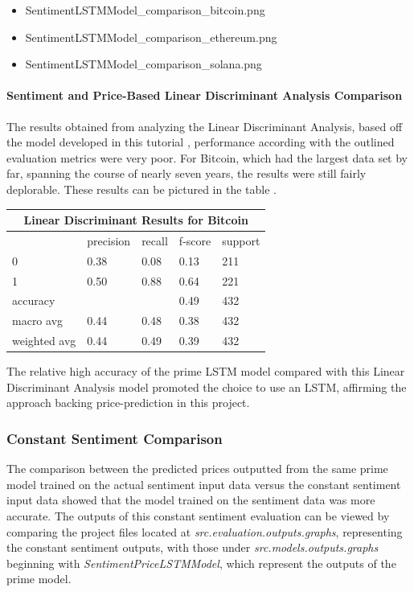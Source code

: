 \documentclass[10pt,twocolumn]{article}
\begin{document}
\begin{itemize}
    \item SentimentLSTMModel\_comparison\_bitcoin.png
    \item SentimentLSTMModel\_comparison\_ethereum.png
    \item SentimentLSTMModel\_comparison\_solana.png
\end{itemize}

\paragraph{Sentiment and Price-Based Linear Discriminant Analysis Comparison}

The results obtained from analyzing the Linear Discriminant Analysis, based off the model developed in this tutorial \textcite{SampleSentimentModel}, performance according with the outlined evaluation metrics were very poor. For Bitcoin, which had the largest data set by far, spanning the course of nearly seven years, the results were still fairly deplorable. These results can be pictured in the table .

\begin{tabular}{ |p{1.25cm}||p{1.15cm}|p{1cm}|p{1cm}|p{1cm}|  }
 \hline
 \multicolumn{5}{|c|}{Linear Discriminant Results for Bitcoin} \\
 \hline
  & precision & recall & f-score & support \\
 \hline
 0 & 0.38 & 0.08 & 0.13 & 211 \\
 1 & 0.50 & 0.88 & 0.64 & 221 \\
 \hline
 accuracy & & & 0.49 & 432 \\
 macro avg & 0.44 & 0.48 & 0.38 & 432 \\
 weighted avg & 0.44 & 0.49 & 0.39 & 432 \\
 \hline
\end{tabular}
\label{linearDiscriminantResultsBitcoin}

The relative high accuracy of the prime LSTM model compared with this Linear Discriminant Analysis model promoted the choice to use an LSTM, affirming the approach backing price-prediction in this project.

\subsubsection{Constant Sentiment Comparison}

The comparison between the predicted prices outputted from the same prime model trained on the actual sentiment input data versus the constant sentiment input data showed that the model trained on the sentiment data was more accurate. The outputs of this constant sentiment evaluation can be viewed by comparing the project files located at \textit{src.evaluation.outputs.graphs}, representing the constant sentiment outputs, with those under \textit{src.models.outputs.graphs} beginning with \textit{SentimentPriceLSTMModel}, which represent the outputs of the prime model.
\end{document}
